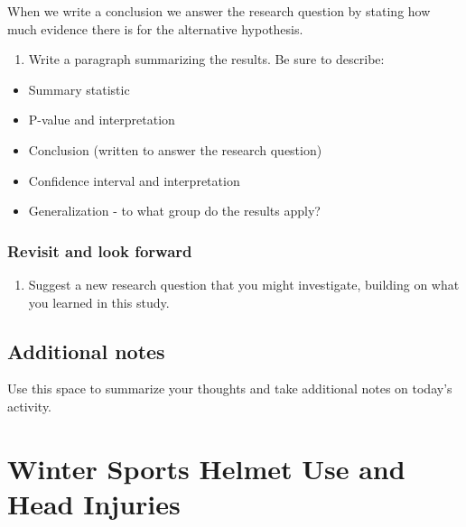 \documentclass[
]{report}
\providecommand{\tightlist}{%
  \setlength{\itemsep}{0pt}\setlength{\parskip}{0pt}}
\begin{document}
When we write a conclusion we answer the research question by stating how much evidence there is for the alternative hypothesis.

\begin{enumerate}
\def\labelenumi{\arabic{enumi}.}
\setcounter{enumi}{28}
\tightlist
\item
  Write a paragraph summarizing the results. Be sure to describe:
\end{enumerate}

\begin{itemize}
\item
  Summary statistic
\item
  P-value and interpretation
\item
  Conclusion (written to answer the research question)
\item
  Confidence interval and interpretation
\item
  Generalization - to what group do the results apply?
\end{itemize}

\vspace{3.5in}

\hypertarget{revisit-and-look-forward}{%
\subsection*{Revisit and look forward}\label{revisit-and-look-forward}}

\begin{enumerate}
\def\labelenumi{\arabic{enumi}.}
\setcounter{enumi}{29}
\tightlist
\item
  Suggest a new research question that you might investigate, building on what you learned in this study.
\end{enumerate}

\vspace{.6in}

\newpage

\hypertarget{additional-notes}{%
\section{Additional notes}\label{additional-notes}}

Use this space to summarize your thoughts and take additional notes on today's activity.

\hypertarget{winter-sports-helmet-use-and-head-injuries}{%
\chapter{Winter Sports Helmet Use and Head Injuries}\label{winter-sports-helmet-use-and-head-injuries}}
\end{document}
